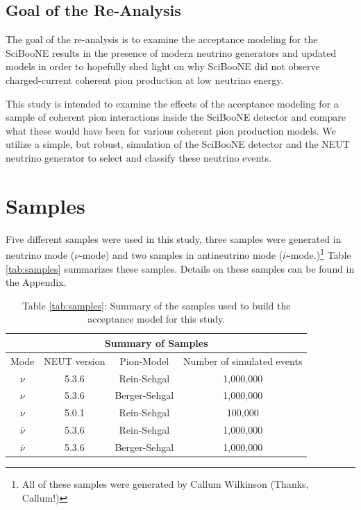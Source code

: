 \documentclass[11pt]{article}
\begin{document}
\subsection{Goal of the Re-Analysis}\label{sec:goals}
The goal of the re-analysis is to examine the acceptance modeling for the SciBooNE results in the presence of modern neutrino generators and updated models in order to hopefully shed light on why SciBooNE did not observe charged-current coherent pion production at low neutrino energy.

This study is intended to examine the effects of the acceptance modeling for a sample of coherent pion interactions inside the SciBooNE detector and compare what these would have been for various coherent pion production models. We utilize a simple, but robust, simulation of the SciBooNE detector and the NEUT neutrino generator to select and classify these neutrino events. 



\section{Samples}\label{sec:samples}
Five different samples were used in this study, three samples were generated in neutrino mode ($\nu$-mode) and two samples in antineutrino mode ($\bar{\nu}$-mode.)\footnote{All of these samples were generated by Callum Wilkinson (Thanks, Callum!)} Table \ref*{tab:samples} summarizes these samples. Details on these samples can be found in the Appendix.

\begin{center}
\begin{table}[htb]
	\begin{center}
	\begin{tabular}{c|c|c|c}
	\multicolumn{4}{c}{\textbf{Summary of Samples}} \\
	\hline \hline
	 Mode & NEUT version & Pion-Model & Number of simulated events\\
	\hline
	 $\nu$ & 5.3.6 & Rein-Sehgal & 1,000,000 \\
	\hline
	$\nu$ & 5.3.6 & Berger-Sehgal & 1,000,000 \\
	\hline
	$\nu$ & 5.0.1 & Rein-Sehgal & 100,000 \\
	\hline
	 $\bar{\nu}$ & 5.3.6 & Rein-Sehgal & 1,000,000 \\
	\hline
	$\bar{\nu}$ & 5.3.6 & Berger-Sehgal & 1,000,000 \\
	\hline
	\end{tabular}%
	\caption*{Table \ref*{tab:samples}: Summary of the samples used to build the acceptance model for this study.} 
	\end{center}
\end{table}\label{tab:samples}
\end{center}
\end{document}
